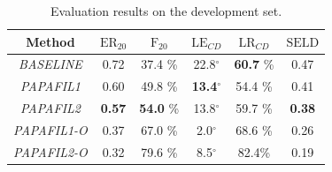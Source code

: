 \begin{table}[th!]
\begin{footnotesize}
\caption{Evaluation results on the development set.}
    \begin{center}
    \begin{tabular}{cccccc}
    \toprule
    Method   & $\text{ER}_{20}$ & $\text{F}_{20}$   & $\text{LE}_{CD}$ & $\text{LR}_{CD}$ & $\text{SELD}$ \\
    \midrule
    \textit{BASELINE} & 0.72   & 37.4 \% & 22.8$^{\circ}$ & \textbf{60.7} \% & 0.47 \\
    \textit{PAPAFIL1} & 0.60 & 49.8 \% & \textbf{13.4}$^{\circ}$ & 54.4 \% &0.41\\

    \textit{PAPAFIL2} & \textbf{0.57} & \textbf{54.0} \% &13.8$^{\circ}$ & 59.7 \% & \textbf{ 0.38} \\
    
    \midrule
    \textit{PAPAFIL1-O} & 0.37 & 67.0 \% & 2.0$^{\circ}$ & 68.6 \% & 0.26 \\
    \textit{PAPAFIL2-O} & 0.32 & 79.6 \% & 8.5$^{\circ}$ & 82.4\% & 0.19 \\
    
    
    
    \bottomrule
    \end{tabular}
    \end{center}
    \label{tab:results}
\end{footnotesize}
\end{table}

